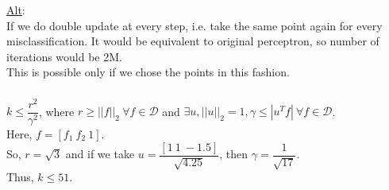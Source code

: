 \documentclass[12pt, fleqn]{article}
\begin{document}
\underline{Alt}: \\
If we do double update at every step, i.e. take the same point again for every misclassification. It would be equivalent to original perceptron, so number of iterations would be 2M. \\
This is possible only if we chose the points in this fashion.

\subsubsection{}
$k \le \dfrac{r^2}{\gamma^2}$, where $r \ge ||f||_2 \ \forall f \in \mathcal{D}$ and $\exists u, ||u||_2 = 1, \gamma \le |u^T f| \ \forall f \in \mathcal{D}$. \\
Here, $f = [f_1 \ f_2 \ 1]$. \\
So, $r = \sqrt{3}$ and if we take $u = \dfrac{[1 \ 1 \ -1.5]}{\sqrt{4.25}}$, then $\gamma = \dfrac{1}{\sqrt{17}}$. \\
Thus, $k \le 51$.
\end{document}
